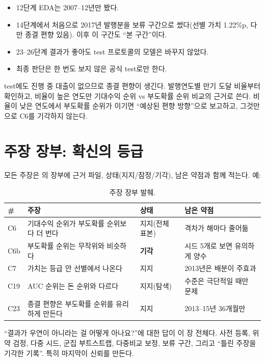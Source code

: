 \begin{itemize}[leftmargin=*]
\item 12단계 EDA는 2007--12년만 봤다.
\item 14단계에서 처음으로 2017년 발행분을 보류 구간으로 썼다(선별 가치 1.22\%p, 다만 종결 편향 있음). 이후 이 구간도 ``본 구간''이다.
\item 23--26단계 결과가 좋아도 test 프로토콜의 모델은 바꾸지 않았다.
\item 최종 판단은 한 번도 보지 않은 공식 test로만 한다.
\end{itemize}

\begin{warnbox}
test에도 진행 중 대출이 없으므로 종결 편향이 생긴다. 발행연도별 만기 도달 비율부터 확인하고, 비율이 높은 연도만 기대수익 순위 vs 부도확률 순위 비교의 근거로 쓴다. 비율이 낮은 연도에서 부도확률 순위가 이기면 ``예상된 편향 방향''으로 보고하고, 그것만으로 C6를 기각하지 않는다.
\end{warnbox}

\section{주장 장부: 확신의 등급}
모든 주장은 의 장부에 근거 파일, 상태(지지/잠정/기각), 남은 약점과 함께 적는다. 예:

\begin{table}[H]\centering\small
\begin{tabularx}{\linewidth}{@{}p{8mm}Lp{20mm}L@{}}\toprule
\# & 주장 & 상태 & 남은 약점\\\midrule
C6 & 기대수익 순위가 부도확률 순위보다 더 번다 & 지지(전체 표본) & 격차가 해마다 줄어듦\\
C6b & 부도확률 순위는 무작위와 비슷하다 & \textbf{기각} & 시드 5개로 보면 유의하게 양수\\
C7 & 가치는 등급 안 선별에서 나온다 & 지지 & 2013년은 배분이 주효과\\
C19 & AUC 순위는 돈 순위와 다르다 & 지지(탐색) & 수준은 극단적일 때만 문제\\
C23 & 종결 편향은 부도확률 순위를 유리하게 만든다 & 지지 & 2013--15년 36개월만\\\bottomrule
\end{tabularx}
\caption{주장 장부 발췌.}
\end{table}

\begin{career}
``결과가 우연이 아니라는 걸 어떻게 아나요?''에 대한 답이 이 장 전체다. 사전 등록, 위약 검정, 다중 시드, 군집 부트스트랩, 다중비교 보정, 보류 구간, 그리고 ``틀린 주장을 기각한 기록''. 특히 마지막이 신뢰를 만든다.
\end{career}
